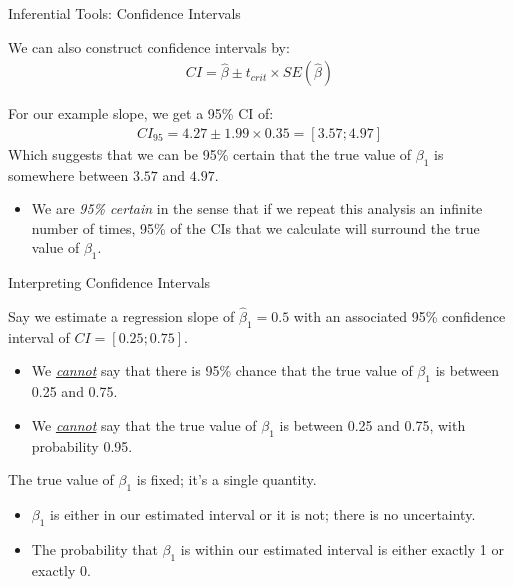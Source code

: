 \documentclass[10pt]{beamer}\usepackage[]{graphicx}\usepackage[]{color}
\begin{document}
\watermarkon %


\begin{frame}{Inferential Tools: Confidence Intervals}

  We can also construct confidence intervals by:
  \begin{align*}
    CI = \hat{\beta} \pm t_{crit} \times SE\left(\hat{\beta}\right)
  \end{align*}
  
  For our example slope, we get a 95\% CI of:
  \begin{align*}
    CI_{95} = 4.27 \pm 1.99 \times
    0.35 = [3.57; 4.97]
  \end{align*}
  Which suggests that we can be 95\% certain that the true value of $\beta_1$ is
  somewhere between $3.57$ and $4.97$.
  \vc
  \begin{itemize}
  \item We are \emph{95\% certain} in the sense that if we repeat this analysis 
    an infinite number of times, 95\% of the CIs that we calculate will surround
    the true value of $\beta_1$.
  \end{itemize}
  
\end{frame}


\begin{frame}{Interpreting Confidence Intervals}
  
  Say we estimate a regression slope of $\hat{\beta}_1 = 0.5$ with an associated
  95\% confidence interval of $CI = [0.25; 0.75]$.
  \pause
  \vc
  \begin{itemize}
  \item We \emph{\underline{cannot}} say that there is 95\% chance that the true 
    value of $\beta_1$ is between 0.25 and 0.75.
    \vc
  \item We \emph{\underline{cannot}} say that the true value of $\beta_1$ is 
    between 0.25 and 0.75, with probability 0.95.
  \end{itemize}
  \vb  
  \pause
  The true value of $\beta_1$ is fixed; it's a single quantity.
  \begin{itemize}
  \item $\beta_1$ is either in our estimated interval or it is not; there is no 
    uncertainty.
    \vc
  \item The probability that $\beta_1$ is within our estimated interval is either 
    exactly 1 or exactly 0.
  \end{itemize}
  
\end{frame}
\end{document}
